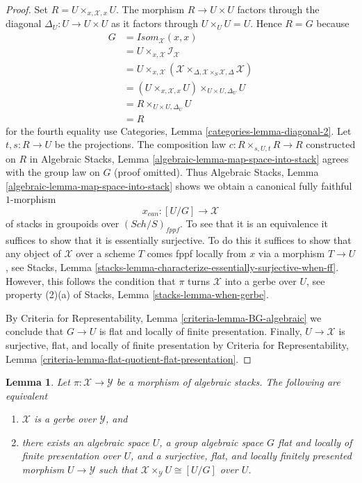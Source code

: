 \documentclass{stacks-project}
\theoremstyle{plain}
\newtheorem{lemma}[subsection]{Lemma}
\theoremstyle{definition}
\theoremstyle{remark}
\numberwithin{equation}{subsection}
\def\Sch{\mathit{Sch}}
\begin{document}
\begin{proof}
Set $R = U \times_{x, \mathcal{X}, x} U$. The morphism $R \to U \times U$
factors through the diagonal $\Delta_U : U \to U \times U$ as it factors
through $U \times_U U = U$. Hence $R = G$ because
\begin{align*}
G & = \mathit{Isom}_\mathcal{X}(x, x) \\
& = U \times_{x, \mathcal{X}} \mathcal{I}_\mathcal{X} \\
& = U \times_{x, \mathcal{X}}
(\mathcal{X}
\times_{\Delta, \mathcal{X} \times_S \mathcal{X}, \Delta}
\mathcal{X}) \\
& = (U \times_{x, \mathcal{X}, x} U) \times_{U \times U, \Delta_U} U \\
& = R \times_{U \times U, \Delta_U} U \\
& = R
\end{align*}
for the fourth equality use
Categories, Lemma \ref{categories-lemma-diagonal-2}.
Let $t, s : R \to U$ be the projections.
The composition law $c : R \times_{s, U, t} R \to R$ constructed on $R$ in
Algebraic Stacks, Lemma \ref{algebraic-lemma-map-space-into-stack}
agrees with the group law on $G$ (proof omitted). Thus
Algebraic Stacks, Lemma \ref{algebraic-lemma-map-space-into-stack}
shows we obtain a canonical fully faithful $1$-morphism
$$
x_{can} : [U/G] \longrightarrow \mathcal{X}
$$
of stacks in groupoids over $(\Sch/S)_{fppf}$. To see that it is
an equivalence it suffices to show that it is essentially surjective.
To do this it suffices to show that any object of $\mathcal{X}$ over
a scheme $T$ comes fppf locally from $x$ via a morphism $T \to U$, see
Stacks, Lemma \ref{stacks-lemma-characterize-essentially-surjective-when-ff}.
However, this follows the condition that $\pi$ turns $\mathcal{X}$
into a gerbe over $U$, see property (2)(a) of
Stacks, Lemma \ref{stacks-lemma-when-gerbe}.

\medskip\noindent
By
Criteria for Representability, Lemma \ref{criteria-lemma-BG-algebraic}
we conclude that $G \to U$ is flat and locally of finite presentation.
Finally, $U \to \mathcal{X}$ is surjective, flat, and locally of finite
presentation by
Criteria for Representability, Lemma
\ref{criteria-lemma-flat-quotient-flat-presentation}.
\end{proof}

\begin{lemma}
\label{lemma-local-structure-gerbe}
Let $\pi : \mathcal{X} \to \mathcal{Y}$ be a morphism of algebraic stacks.
The following are equivalent
\begin{enumerate}
\item $\mathcal{X}$ is a gerbe over $\mathcal{Y}$, and
\item there exists an algebraic space $U$, a group algebraic space $G$
flat and locally of finite presentation over $U$, and a
surjective, flat, and locally finitely presented
morphism $U \to \mathcal{Y}$ such that
$\mathcal{X} \times_\mathcal{Y} U \cong [U/G]$ over $U$.
\end{enumerate}
\end{lemma}
\end{document}
